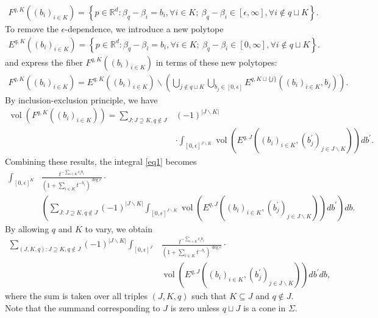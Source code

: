 \documentclass[11pt,reqno]{amsart}
\def\R {{\mathbb R}}
\theoremstyle{definition}
\numberwithin{equation}{section}
\begin{document}
\begin{align*}
	F^{q,K}((b_i)_{i\in K})=\left\{p\in\R^d:\beta_q-\beta_i=b_i,\forall i\in K;\ \beta_q-\beta_i\in[\epsilon,\infty],\forall i\not\in q\sqcup K\right\} .
\end{align*}
To remove the $\epsilon$-dependence, we introduce a new polytope
\begin{align*}
	E^{q,K}((b_i)_{i\in K})=\left\{p\in\R^d:\beta_q-\beta_i=b_i,\forall i\in K;\ \beta_q-\beta_i\in[0,\infty],\forall i\not\in q\sqcup K\right\} .
\end{align*}
and express the fiber $F^{q,K}((b_i)_{i\in K})$ in terms of these new polytopes:
\begin{align*}
	F^{q,K}((b_i)_{i\in K})=E^{q,K}((b_i)_{i\in K})\backslash \left(\bigcup_{j\not\in q\sqcup K}\bigcup_{b_j\in[0,\epsilon]}E^{q,K\sqcup\{j\}}((b_i)_{i\in K},b_j)\right) .
\end{align*}
By inclusion-exclusion principle, we have
\begin{align*}
	\operatorname{vol}(F^{q,K}((b_i)_{i\in K}))=\sum_{J:J\supseteq K,q\not\in J}&(-1)^{|J\backslash K|}\\
	&\cdot\int_{[0,\epsilon]^{J\backslash K}}\operatorname{vol}(E^{q, J}((b_i)_{i\in K},(b_{j}^{\prime})_{j\in J\backslash K}))db^{\prime} .
\end{align*}
Combining these results, the integral \eqref{eq1} becomes
\begin{align*}
	\int_{[0,\epsilon]^K}&\frac{t^{-\sum_{i\in K}c_ib_i}}{\left(1+\sum_{i\in K}t^{-b_i}\right)^{\deg c}}\cdot\\
	&\left(\sum_{J:J\supseteq K,q\not\in J}(-1)^{|J\backslash K|}\int_{[0,\epsilon]^{J\backslash K}}\operatorname{vol}(E^{q, J}((b_i)_{i\in K},(b_{j}^{\prime})_{j\in J\backslash K}))db^{\prime}\right)db .
\end{align*}
By allowing $q$ and $K$ to vary, we obtain
\begin{equation}\label{eq2}
	\begin{aligned}
	\sum_{(J,K,q):J\supseteq K,q\not\in J}(-1)^{|J\backslash K|}\int_{[0,\epsilon]^J}&\frac{t^{-\sum_{i\in K}c_ib_i}}{\left(1+\sum_{i\in K}t^{-b_i}\right)^{\deg c}}\cdot \\ 
	&\operatorname{vol}(E^{q, J}((b_i)_{i\in K},(b_{j}^{\prime})_{j\in J\backslash K}))db^{\prime}db ,
\end{aligned}
\end{equation}
where the sum is taken over all triples $(J,K,q)$ such that $K\subseteq J$ and $q\not\in J$. Note that the summand corresponding to $J$ is zero unless $q\sqcup J$ is a cone in $\Sigma$.
\end{document}
